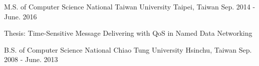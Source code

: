 

\begin{cventries}

  \cventry
    {M.S. of Computer Science} %
    {National Taiwan University} %
    {Taipei, Taiwan} %
    {Sep. 2014 - June. 2016} %
    {
      \begin{cvitems} %
        \item {Thesis: Time-Sensitive Message Delivering with QoS in Named Data Networking}
      \end{cvitems}
    }

  \cventry
    {B.S. of Computer Science} %
    {National Chiao Tung University} %
    {Hsinchu, Taiwan} %
    {Sep. 2008 - June. 2013} %
    {
    }
\end{cventries}

